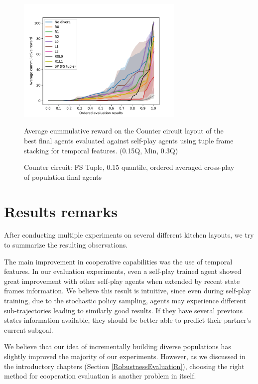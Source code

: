 \begin{figure}[!ht]
    \centering
    \includegraphics*[width=8cm]{../img/CounterCircuitFSTupleOrderedQ15.png}

    \caption{Counter circuit: FS Tuple, 0.15 quantile, ordered averaged cross-play of population final agents}
    \label{CounterCircuitFSTupleOrderedQ15}
    \medskip
    \small 
    Average cummulative reward on the Counter circuit layout of the best final agents evaluated against self-play agents using tuple frame stacking for temporal features.
    (0.15Q, Min, 0.3Q)

\end{figure}



\section{Results remarks}

After conducting multiple experiments on several different kitchen layouts, we try to summarize the resulting observations.

The main improvement in cooperative capabilities was the use of temporal features.
In our evaluation experiments, even a self-play trained agent showed great improvement with other self-play agents when extended by recent state frames information.
We believe this result is intuitive, since even during self-play training, due to the stochastic policy sampling, agents may experience different sub-trajectories leading to similarly good results.
If they have several previous states information available, they should be better able to predict their partner's current subgoal.

We believe that our idea of incrementally building diverse populations has slightly improved the majority of our experiments.
However, as we discussed in the introductory chapters (Section \ref{RobustnessEvaluation}), choosing the right method for cooperation evaluation is another problem in itself.

